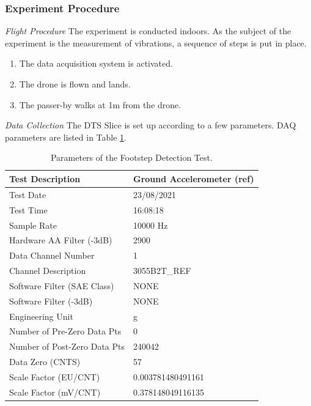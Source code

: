 \subsubsection{Experiment Procedure}
\textit{Flight Procedure}\hspace{0.3cm} The experiment is conducted indoors. 
As the subject of the experiment is the measurement of vibrations, a sequence of steps is put in place.

\begin{enumerate}
    \item The data acquisition system is activated.
    \item The drone is flown and lands. 
    \item The passer-by walks at 1m from the drone.
\end{enumerate}

\textit{Data Collection}\hspace{0.3cm} The DTS Slice is set up according to a few parameters. DAQ parameters are listed in Table \ref{tab:footstep_testsettings}. 

\begin{table}[h]
  \footnotesize%
  \begin{flushleft}

    \begin{tabular}{ll}
      \toprule
      Test Description & Ground Accelerometer (ref)  \\
      \midrule
      Test Date                     &  23/08/2021 \\
      Test Time                     &  16:08:18 \\
      Sample Rate                   &  10000 Hz  \\
      Hardware AA Filter (-3dB)     & 2900    \\
      Data Channel Number           &	1    \\
      Channel Description           & 3055B2T\_REF   \\
        Software Filter (SAE Class)	&NONE \\
        Software Filter (-3dB)	&NONE \\
        Engineering Unit	&g \\
      Number of Pre-Zero Data Pts	& 0	  \\
      Number of Post-Zero Data Pts	& 240042	  \\
      Data Zero (CNTS)	            & 57 \\
    Scale Factor (EU/CNT)	        & 0.003781480491161	  \\
    Scale Factor (mV/CNT)	        & 0.378148049116135  \\
      \bottomrule
    \end{tabular}
  \end{flushleft}

  \caption{Parameters of the Footstep Detection Test.}
  \label{tab:footstep_testsettings}
\end{table}
 
